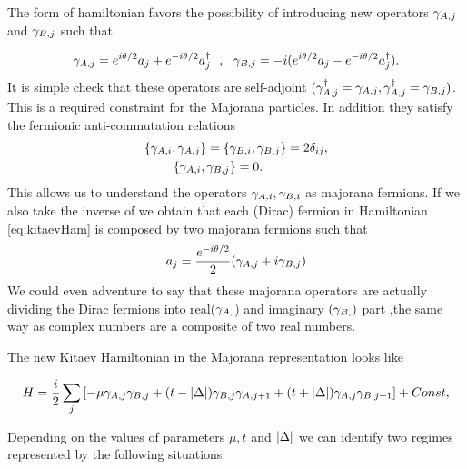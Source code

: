 The form of hamiltonian  favors the possibility of introducing new operators $\gamma_{A,j}$ and $\gamma_{B,j}$ such that

\begin{equation}
\gamma_{A,j} = e^{i\theta /2}a_j+ e^{-i\theta/2 } a^{\dagger}_j \ \ , \ \ \gamma_{B,j} = -i(e^{i\theta /2}a_j - e^{-i\theta/2} a^{\dagger}_j).
\label{eq:majoranaTrans}
\end{equation}
It is simple check that these operators are self-adjoint $(\gamma_{A,j}^\dagger = \gamma_{A,j}, \gamma_{A,j}^\dagger = \gamma_{B,j})$. This is a required constraint for the Majorana particles. In addition they satisfy the fermionic anti-commutation relations
\begin{equation}
\begin{aligned}
\{\gamma_{A,i}, \gamma_{A,j}\} = \{ & \gamma_{B,i} , \gamma_{B,j}\} = 2\delta_{ij}  ,\\ 
  \{\gamma_{A,i}, \gamma_{B,j} & \} =0.
\end{aligned} 
\label{majoranaRel}
\end{equation} 
This allows us to understand the operators $\gamma_{A,i} , \gamma_{B,i}$ as majorana fermions. If we also take the inverse of  we obtain that each  (Dirac) fermion in Hamiltonian \eqref{eq:kitaevHam} is composed by two majorana fermions such that 
$$a_j = \frac{e^{-i\theta/2}}{2}(\gamma_{A,j}+ i\gamma_{B,j})$$
We could even adventure to say that these majorana operators are actually dividing the Dirac fermions into real($\gamma_{A,}$) and imaginary $(\gamma_{B,})$ part ,the same way as complex numbers are a composite of two real numbers. 

The new Kitaev Hamiltonian in the Majorana representation looks like 

\begin{equation}
H = \frac{i}{2} \sum_{j} \left[ -\mu \gamma_{A,j}\gamma_{B,j}  + (t- \vert \Delta \vert) \gamma_{B,j}\gamma_{A,j+1} + (t+ \vert \Delta \vert) \gamma_{A,j}\gamma_{B,j+1} \right]+Const,\label{eq:HamMajorana}
\end{equation}

Depending on the values of parameters $\mu, t$ and $\vert \Delta \vert$ we can identify two regimes represented by the following situations:




